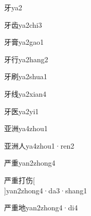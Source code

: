 \begin{verbete}[4]{牙}{ya2}
\end{verbete}

\begin{verbete}[4;8]{牙齿}{ya2chi3}
\end{verbete}

\begin{verbete}[4;14]{牙膏}{ya2gao1}
\end{verbete}

\begin{verbete}[4;6]{牙行}{ya2hang2}
\end{verbete}

\begin{verbete}[4;8]{牙刷}{ya2shua1}
\end{verbete}

\begin{verbete}[4;8]{牙线}{ya2xian4}
\end{verbete}

\begin{verbete}[4;7]{牙医}{ya2yi1}
\end{verbete}

\begin{verbete*}[6;9]{亚洲}{ya4zhou1}
\end{verbete*}

\begin{verbete}[6;9;2]{亚洲人}{ya4zhou1·ren2}
\end{verbete}

\begin{verbete}[7;9]{严重}{yan2zhong4}
\end{verbete}

\begin{verbete}[7;9;5;6]{严重打伤}[\\]{yan2zhong4·da3·shang1}
\end{verbete}

\begin{verbete}[7;9;6]{严重地}{yan2zhong4·di4}
\end{verbete}

